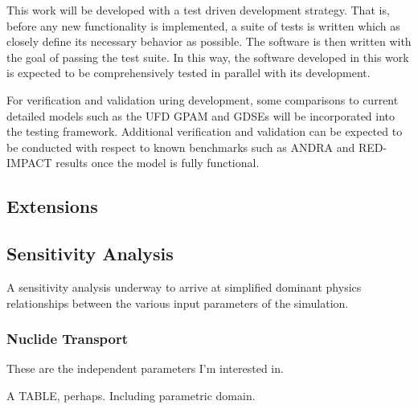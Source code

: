    
  This work will be developed with a test driven development strategy. That is, 
  before any new functionality is implemented, a suite of tests is written which 
  as closely define its necessary behavior as possible. The software is then 
  written with the goal of passing the test suite. In this way, the software 
  developed in this work is expected to be comprehensively tested in parallel 
  with its development. 


  For verification and validation uring development, some comparisons to current 
  detailed models such as the \gls{UFD} \gls{GPAM} and GDSEs will be 
  incorporated into the testing framework. Additional verification and 
  validation can be expected to be conducted with respect to known benchmarks 
  such as \gls{ANDRA} and RED-IMPACT results once the model is fully functional.


\subsection{Extensions}











\subsection{Sensitivity Analysis}

A sensitivity analysis underway to arrive at simplified dominant physics 
relationships between the various input parameters of the simulation. 

\subsubsection{Nuclide Transport}

These are the independent parameters I'm interested in.

A TABLE, perhaps. Including parametric domain.


